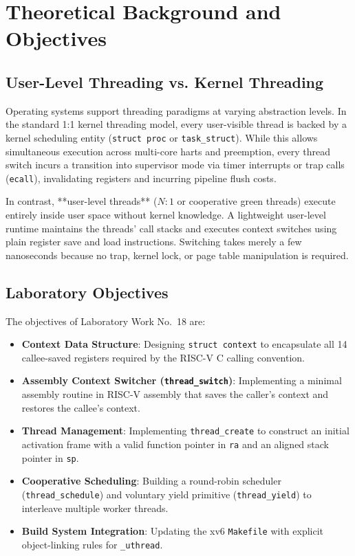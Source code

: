 \documentclass[12pt,a4paper]{article}
\begin{document}
\section{Theoretical Background and Objectives}

\subsection{User-Level Threading vs. Kernel Threading}
Operating systems support threading paradigms at varying abstraction levels. In the standard 1:1 kernel threading model, every user-visible thread is backed by a kernel scheduling entity (\texttt{struct proc} or \texttt{task\_struct}). While this allows simultaneous execution across multi-core harts and preemption, every thread switch incurs a transition into supervisor mode via timer interrupts or trap calls (\texttt{ecall}), invalidating registers and incurring pipeline flush costs.

In contrast, **user-level threads** ($N:1$ or cooperative green threads) execute entirely inside user space without kernel knowledge. A lightweight user-level runtime maintains the threads' call stacks and executes context switches using plain register save and load instructions. Switching takes merely a few nanoseconds because no trap, kernel lock, or page table manipulation is required.

\subsection{Laboratory Objectives}
The objectives of Laboratory Work No.~18 are:
\begin{itemize}
    \item \textbf{Context Data Structure}: Designing \texttt{struct context} to encapsulate all 14 callee-saved registers required by the RISC-V C calling convention.
    \item \textbf{Assembly Context Switcher (\texttt{thread\_switch})}: Implementing a minimal assembly routine in RISC-V assembly that saves the caller's context and restores the callee's context.
    \item \textbf{Thread Management}: Implementing \texttt{thread\_create} to construct an initial activation frame with a valid function pointer in \texttt{ra} and an aligned stack pointer in \texttt{sp}.
    \item \textbf{Cooperative Scheduling}: Building a round-robin scheduler (\texttt{thread\_schedule}) and voluntary yield primitive (\texttt{thread\_yield}) to interleave multiple worker threads.
    \item \textbf{Build System Integration}: Updating the xv6 \texttt{Makefile} with explicit object-linking rules for \texttt{\_uthread}.
\end{itemize}
\end{document}
